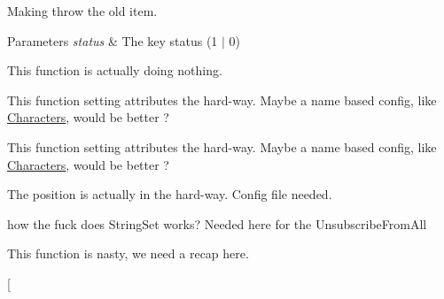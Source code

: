 
\begin{DoxyRefList}
\item[\label{todo__todo000001}%
\hypertarget{todo__todo000001}{}%
Member \hyperlink{class_characters_aee824830a67177342ae606f959fb0c7a}{Characters\+:\+:\+\_\+pickup\+Item} (int status)]Making throw the old item. 
\begin{DoxyParams}{Parameters}
{\em status} & The key status (1 $\vert$ 0)  \\
\hline
\end{DoxyParams}

\item[\label{todo__todo000004}%
\hypertarget{todo__todo000004}{}%
Member \hyperlink{class_consumable_adb866e69c3796edffad832b88e527518}{Consumable\+:\+:Begin\+Contact} (\hyperlink{class_elements}{Elements} $\ast$elem, b2\+Contact $\ast$contact)]This function is actually doing nothing.  
\item[\label{todo__todo000002}%
\hypertarget{todo__todo000002}{}%
Member \hyperlink{class_consumable_ae374944f6333618dd08318b98b6950c7}{Consumable\+:\+:Consumable} ()]This function setting attributes the hard-\/way. Maybe a name based config, like \hyperlink{class_characters}{Characters}, would be better ?  
\item[\label{todo__todo000003}%
\hypertarget{todo__todo000003}{}%
Member \hyperlink{class_consumable_adeca9f0d06a24fb2b76ddaa1396d1ddc}{Consumable\+:\+:Consumable} (\hyperlink{class_characters}{Characters} $\ast$c)]This function setting attributes the hard-\/way. Maybe a name based config, like \hyperlink{class_characters}{Characters}, would be better ?  
\item[\label{todo__todo000005}%
\hypertarget{todo__todo000005}{}%
Member \hyperlink{class_equipment_a2bd67c4254f2074f4f7469f29a20e760}{Equipment\+:\+:Equipment} ()]The position is actually in the hard-\/way. Config file needed.  
\item[\label{todo__todo000006}%
\hypertarget{todo__todo000006}{}%
Member \hyperlink{class_game_ae3c5dc329506d37d244ef3587ac813af}{Game\+:\+:add\+To\+Destroy\+List} (\hyperlink{class_elements}{Elements} $\ast$m)]how the fuck does String\+Set works? Needed here for the Unsubscribe\+From\+All  
\item[\label{todo__todo000007}%
\hypertarget{todo__todo000007}{}%
Member \hyperlink{class_game_a194dbc017575c98bda4e2317d266a67e}{Game\+:\+:display\+H\+U\+D} (void)]This function is nasty, we need a recap here.  
\item[\label{todo__todo000008}%
\hypertarget{todo__todo000008}{}%

\end{DoxyRefList}
